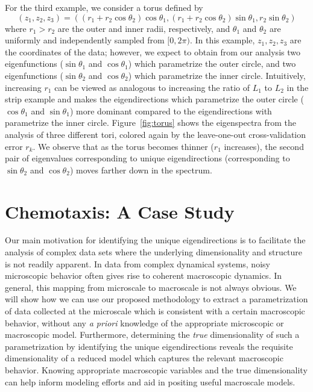 \documentclass[3p]{elsarticle}
\begin{document}
For the third example, we consider a torus defined by
%
\begin{equation} \label{eq:torus}
\left( z_1, z_2, z_3 \right) = \left(  
(r_1 + r_2 \cos \theta_2 ) \cos \theta_1, 
(r_1 + r_2 \cos \theta_2 ) \sin \theta_1, 
r_2 \sin \theta_2
\right) 
\end{equation}
%
where $r_1 > r_2$ are the outer and inner radii, respectively, and $\theta_1$ and $\theta_2$ are uniformly and independently sampled from $[0, 2\pi)$.
%
In this example, $z_1, z_2, z_3$ are the coordinates of the data; however, we expect to obtain from our analysis 
two eigenfunctions ($\sin \theta_1$ and $\cos \theta_1$) which parametrize the outer circle, and 
two eigenfunctions ($\sin \theta_2$ and $\cos \theta_2$) which parametrize the inner circle.
%
Intuitively, increasing $r_1$ can be viewed as analogous to increasing the ratio of $L_1$ to $L_2$ in the 
strip example and makes the eigendirections which parametrize the outer circle ($\cos \theta_1$ and $\sin \theta_1$) more 
dominant compared to the eigendirections with parametrize the inner circle.
%
Figure~\ref{fig:torus} shows the eigenspectra from the analysis of three different tori, colored again by the leave-one-out cross-validation error $r_k$.
%
We observe that as the torus becomes thinner ($r_1$ increases), the second pair of eigenvalues corresponding to unique eigendirections (corresponding to $\sin \theta_2$ and $\cos \theta_2$) moves farther down in the spectrum.

\section{Chemotaxis: A Case Study}

Our main motivation for identifying the unique eigendirections is to facilitate the analysis of 
complex data sets where the underlying dimensionality and structure is not readily apparent.
%
In data from complex dynamical systems, noisy microscopic behavior often gives rise to coherent macroscopic dynamics.
%
In general, this mapping from microscale to macroscale is not always obvious.
%
We will show how we can use our proposed methodology to extract a parametrization of data collected 
at the microscale which is consistent with a certain macroscopic behavior, without any {\em a priori} knowledge of the appropriate 
microscopic or macroscopic model.
%
Furthermore, determining the {\em true} dimensionality of such a parametrization by identifying 
the unique eigendirections reveals the requisite dimensionality of a reduced model which captures the relevant macroscopic behavior.
%
Knowing appropriate macroscopic variables and the true dimensionality can help inform modeling efforts and aid in 
positing useful macroscale models.
\end{document}
